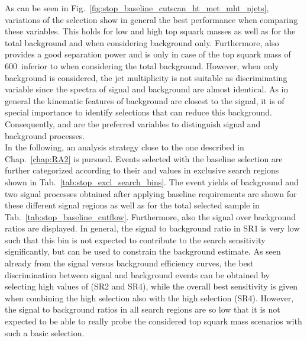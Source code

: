 As can be seen in Fig.~\ref{fig:stop_baseline_cutscan_ht_met_mht_njets}, variations of the \met selection show in general the best performance when comparing these variables. This holds for low and high top squark masses as well as for the total background and when considering \ttbar background only. Furthermore, also \HT provides a good separation power and is only in case of the top squark mass of 600~\gev inferior to \NJets when considering the total background. However, when only \ttbar background is considered, the jet multiplicity is not suitable as discriminating variable since the \NJets spectra of signal and \ttbar background are almost identical. As in general the kinematic features of \ttbar background are closest to the signal, it is of special importance to identify selections that can reduce this background. Consequently, \met and \HT are the preferred variables to distinguish signal and background processes. 
\\
In the following, an analysis strategy close to the one described in Chap.~\ref{chap:RA2} is pursued. Events selected with the baseline selection are further categorized according to their \HT and \met values in exclusive search regions shown in Tab.~\ref{tab:stop_excl_search_bins}. The event yields of background and two signal processes obtained after applying baseline requirements are shown for these different signal regions as well as for the total selected sample in Tab.~\ref{tab:stop_baseline_cutflow}. Furthermore, also the signal over background ratios are displayed. In general, the signal to background ratio in SR1 is very low such that this bin is not expected to contribute to the search sensitivity significantly, but can be used to constrain the background estimate. As seen already from the signal versus background efficiency curves, the best discrimination between signal and background events can be obtained by selecting high values of \met (SR2 and SR4), while the overall best sensitivity is given when combining the high \met selection also with the high \HT selection (SR4). However, the signal to background ratios in all search regions are so low that it is not expected to be able to really probe the considered top squark mass scenarios with such a basic selection. 
